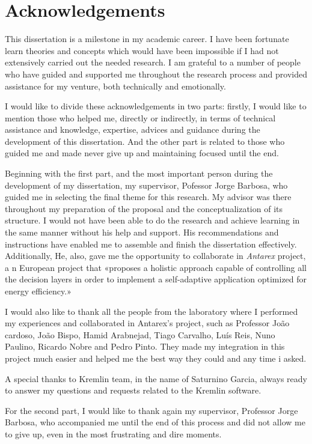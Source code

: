 \chapter*{Acknowledgements}

This dissertation is a milestone in my academic career. I have been fortunate learn theories and concepts which would have been impossible if I had not extensively carried out the needed research. I am grateful to a number of people who have guided and supported me throughout the research process and provided assistance for my venture, both technically and emotionally.

I would like to divide these acknowledgements in two parts: firstly, I would like to mention those who helped me, directly or indirectly, in terms of technical assistance and knowledge, expertise, advices and guidance during the development of this dissertation. And the other part is related to those who guided me and made never give up and maintaining focused until the end.

Beginning with the first part, and the most important person during the development of my dissertation, my supervisor, Pofessor Jorge Barbosa, who guided me in selecting the final theme for this research. My advisor was there throughout my preparation of the proposal and the conceptualization of its structure. I would not have been able to do the research and achieve learning in the same manner without his help and support. His recommendations and instructions have enabled me to assemble and finish the dissertation effectively. Additionally, He, also, gave me the opportunity to collaborate in \textit{Antarex} project, a n European project that «proposes a holistic approach capable of controlling all the decision layers in order to implement a self-adaptive application optimized for energy efficiency.»

I would also like to thank all the people from the laboratory where I performed my experiences and collaborated in Antarex's project, such as Professor João cardoso, João Bispo, Hamid Arabnejad, Tiago Carvalho, Luís Reis, Nuno Paulino, Ricardo Nobre and Pedro Pinto. They made my integration in this project much easier and helped me the best way they could and any time i asked.

A special thanks to Kremlin team, in the name of Saturnino Garcia, always ready to answer my questions and requests related to the Kremlin software.

For the second part, I would like to thank again my supervisor, Professor Jorge Barbosa, who accompanied me until the end of this process and did not allow me to give up, even in the most frustrating and dire moments.

